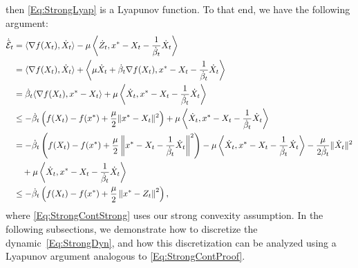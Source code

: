\documentclass[11pt]{article}
\theoremstyle{plain}
\newcommand{\E}{{\mathcal E}}
\begin{document}
then \eqref{Eq:StrongLyap} is a Lyapunov function. To that end, we have the following argument:
\begin{subequations}\label{Eq:StrongContProof}
\begin{align}
\dot {\tilde{\E}}_t  &= \langle \nabla f(X_t), \dot X_t\rangle - \mu\left\langle \dot Z_t, x^\ast - X_t -\frac{1}{\dot \beta_t}  \dot X_t\right\rangle \notag\\
& = \langle \nabla f(X_t), \dot X_t\rangle +  \left\langle\mu \dot X_t +  \dot \beta_t \nabla f(X_t),x^\ast - X_t -\frac{1}{\dot \beta_t}  \dot X_t\right\rangle \notag\\
& = \dot \beta_t \langle  \nabla f(X_t),x^\ast - X_t\rangle +    \mu\left\langle  \dot X_t, x^\ast - X_t- \frac{1}{\dot \beta_t}  \dot X_t\right\rangle \notag\\
& \leq - \dot \beta_t \left(f(X_t) - f(x^\ast) + \frac{\mu}{2}\|x^\ast - X_t\|^2\right)+   \mu \left\langle  \dot X_t, x^\ast - X_t- \frac{1}{\dot \beta_t}  \dot X_t\right\rangle\label{Eq:StrongContStrong}\\
& =  - \dot \beta_t \left(f(X_t) - f(x^\ast) + \frac{\mu}{2}\left\|x^\ast - X_t - \frac{1}{\dot \beta_t} \dot X_t\right\|^2\right) -\mu\left\langle \dot X_t, x^\ast - X_t - \frac{1}{\dot \beta_t} \dot X_t\right\rangle- \frac{\mu}{2\dot \beta_t}\|\dot X_t\|^2\notag \\
&\quad + \mu \left\langle \dot X_t,x^\ast - X_t- \frac{1}{\dot \beta_t}  \dot X_t\right\rangle\notag\\
& \leq   - \dot \beta_t \left(f(X_t) - f(x^\ast) + \frac{\mu}{2}\left\|x^\ast - Z_t\right\|^2\right) \notag,
\end{align}
\end{subequations}
where \eqref{Eq:StrongContStrong} uses our strong convexity assumption. In the following subsections, we demonstrate how to discretize the dynamic~\eqref{Eq:StrongDyn}, and how this discretization can be analyzed using a Lyapunov argument analogous to \eqref{Eq:StrongContProof}.
%
%
%
%
\end{document}
